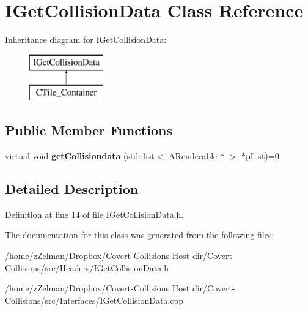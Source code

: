 \hypertarget{classIGetCollisionData}{\section{I\-Get\-Collision\-Data Class Reference}
\label{classIGetCollisionData}
}
Inheritance diagram for I\-Get\-Collision\-Data\-:\begin{figure}[H]
\begin{center}
\leavevmode
\includegraphics[height=2.000000cm]{classIGetCollisionData}
\end{center}
\end{figure}
\subsection*{Public Member Functions}
\begin{DoxyCompactItemize}
\item 
\hypertarget{classIGetCollisionData_ad31b95dda265659e5090fc2c188b30b9}{virtual void {\bfseries get\-Collisiondata} (std\-::list$<$ \hyperlink{classARenderable}{A\-Renderable} $\ast$ $>$ $\ast$p\-List)=0}\label{classIGetCollisionData_ad31b95dda265659e5090fc2c188b30b9}

\end{DoxyCompactItemize}


\subsection{Detailed Description}


Definition at line 14 of file I\-Get\-Collision\-Data.\-h.



The documentation for this class was generated from the following files\-:\begin{DoxyCompactItemize}
\item 
/home/z\-Zelman/\-Dropbox/\-Covert-\/\-Collisions Host dir/\-Covert-\/\-Collisions/src/\-Headers/I\-Get\-Collision\-Data.\-h\item 
/home/z\-Zelman/\-Dropbox/\-Covert-\/\-Collisions Host dir/\-Covert-\/\-Collisions/src/\-Interfaces/I\-Get\-Collision\-Data.\-cpp\end{DoxyCompactItemize}
